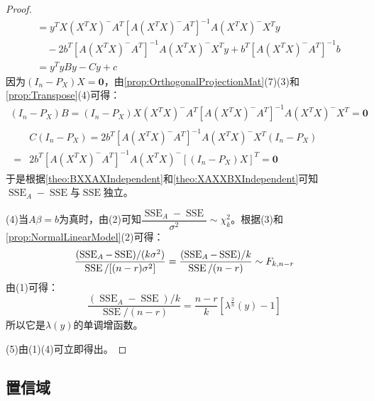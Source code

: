 \begin{proof}
\begin{align*}
		&=y^TX(X^TX)^-A^T[A(X^TX)^-A^T]^{-1}A(X^TX)^-X^Ty \\
		&\quad-2b^T[A(X^TX)^-A^T]^{-1}A(X^TX)^-X^Ty+b^T[A(X^TX)^-A^T]^{-1}b \\
		&=y^TyBy-Cy+c
	\end{align*}
	因为$(I_n-P_X)X=\mathbf{0}$，由\cref{prop:OrthogonalProjectionMat}(7)(3)和\cref{prop:Transpose}(4)可得：
	\begin{gather*}
		(I_n-P_X)B=(I_n-P_X)X(X^TX)^-A^T[A(X^TX)^-A^T]^{-1}A(X^TX)^-X^T=\mathbf{0} \\
		\begin{aligned}
			&C(I_n-P_X)=2b^T[A(X^TX)^-A^T]^{-1}A(X^TX)^-X^T(I_n-P_X) \\
			=&2b^T[A(X^TX)^-A^T]^{-1}A(X^TX)^-[(I_n-P_X)X]^T=\mathbf{0}
		\end{aligned}
	\end{gather*}
	于是根据\cref{theo:BXXAXIndependent}和\cref{theo:XAXXBXIndependent}可知$\operatorname{SSE}_A-\operatorname{SSE}$与$\operatorname{SSE}$独立。\par
	(4)当$A\beta=b$为真时，由(2)可知$\dfrac{\operatorname{SSE}_A-\operatorname{SSE}}{\sigma^2}\sim\chi^2_{k}$。根据(3)和\cref{prop:NormalLinearModel}(2)可得：
	\begin{equation*}
		\frac{(\operatorname{SSE}_A-\operatorname{SSE})/(k\sigma^2)}{\operatorname{SSE}/[(n-r)\sigma^2]}=\frac{(\operatorname{SSE}_A-\operatorname{SSE})/k}{\operatorname{SSE}/(n-r)}\sim F_{k,n-r}\qedhere
	\end{equation*}
	由(1)可得：
	\begin{equation*}
		\frac{(\operatorname{SSE}_A-\operatorname{SSE})/k}{\operatorname{SSE}/(n-r)}=\frac{n-r}{k}[\lambda^{\frac{2}{n}}(y)-1]
	\end{equation*}
	所以它是$\lambda(y)$的单调增函数。\par
	(5)由(1)(4)可立即得出。
\end{proof}

\subsection{置信域}
